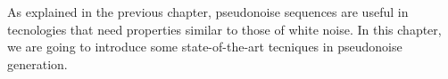 As explained in the previous chapter, pseudonoise sequences are useful in
tecnologies that need properties similar to those of white noise. In this
chapter, we are going to introduce some state-of-the-art tecniques in
pseudonoise generation.





